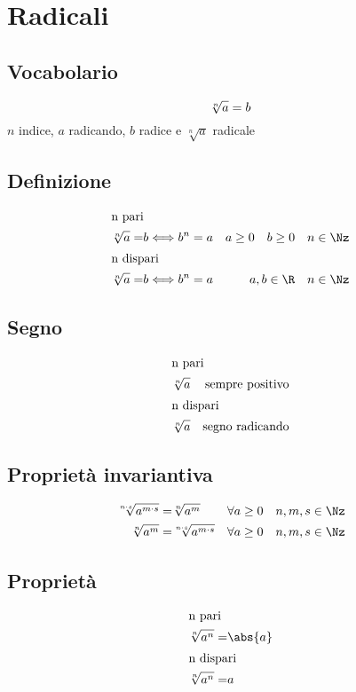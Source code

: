 \chapter{Radicali}
\section{Vocabolario}
\begin{equation}
\sqrt[n]{a}=b\\
\end{equation}
$n$ indice, $a$ radicando, $b$ radice e $\sqrt[n]{a}$ radicale
\section{Definizione}
\begin{align}
\intertext{n pari}
\sqrt[n]{a}=&b\Longleftrightarrow b^n=a&a\geq0\quad b\geq0\quad n\in\Nz\\
\intertext{n dispari}
\sqrt[n]{a}=&b\Longleftrightarrow b^n=a&a,b\in\R\quad n\in\Nz
\end{align}
\section{Segno}
\begin{align}
\intertext{n pari}
\sqrt[n]{a}&&\text{sempre positivo}\\
\intertext{n dispari}
\sqrt[n]{a}&&\text{segno radicando}
\end{align}
\section{Proprietà invariantiva}
\begin{align}
\sqrt[n\cdot s]{a^{m\cdot s}}=&\sqrt[n]{a^m}&\forall a\geq 0\quad n,m,s\in\Nz\\
\sqrt[n]{a^m}=&\sqrt[n\cdot s]{a^{m\cdot s}}&\forall a\geq 0\quad n,m,s\in\Nz
\end{align}
\section{Proprietà}
\begin{align}
\intertext{n pari}
\sqrt[n]{a^n}=&\abs{a}\\
\intertext{n dispari}
\sqrt[n]{a^n}=&a
\end{align}
